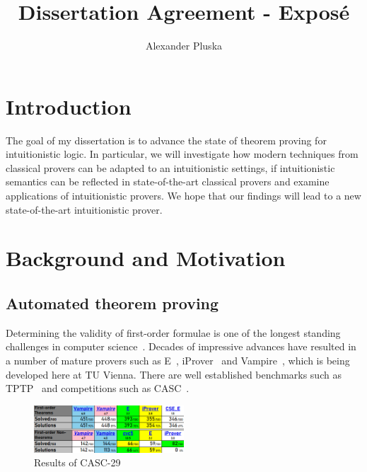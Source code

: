 \documentclass{article}
\author{Alexander Pluska}
\title{Dissertation Agreement - Exposé}
\theoremstyle{definition}
\theoremstyle{definition}
\theoremstyle{definition}
\theoremstyle{definition}
\theoremstyle{definition}
\theoremstyle{definition}
\theoremstyle{definition}
\newcommand{\0}{\mathbf 0}
\newcommand{\1}{\mathbf 1}
\begin{document}
	

	\maketitle

	\section{Introduction}
	
	The goal of my dissertation is to advance the state of theorem proving for intuitionistic logic. In particular, we will investigate how modern techniques from classical provers can be adapted to an intuitionistic settings, if intuitionistic semantics can be reflected in state-of-the-art classical provers and examine applications of intuitionistic provers. We hope that our findings will lead to a new state-of-the-art intuitionistic prover.

	\section{Background and Motivation}

	\subsection{Automated theorem proving}


	Determining the validity of first-order formulae is one of the longest standing challenges in computer science~\cite{robinson1965machine}. Decades of impressive advances have resulted in a number of mature provers such as E~\cite{schulz2002brainiac}, iProver~\cite{korovin2008iprover} and Vampire~\cite{kovacs2013first}, which is being developed here at TU Vienna. There are well established benchmarks such as TPTP~\cite{tptp} and competitions such as CASC~\cite{casc}.
	
	\begin{figure}
		\includegraphics[width=0.5\textwidth]{CASC29.png}
		\caption{Results of CASC-29}
	\end{figure}
\end{document}
